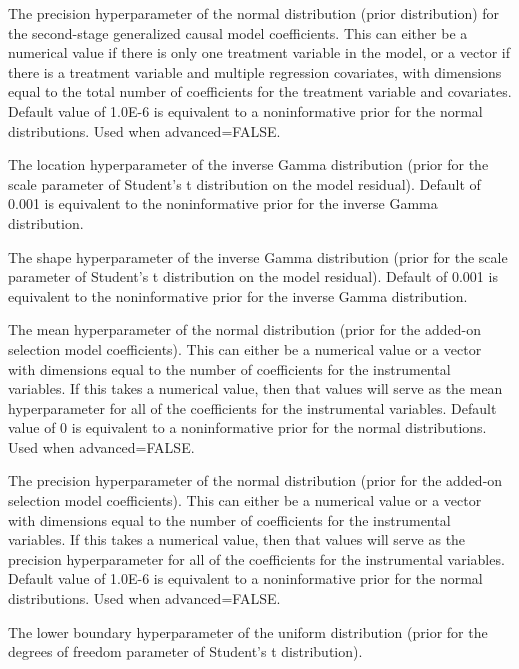 \documentclass[a4paper]{book}
\begin{document}
\begin{Arguments}
\begin{ldescription}
\item[\code{G0}] The precision hyperparameter of the normal distribution (prior distribution)
for the second-stage generalized causal model coefficients.
This can either be a numerical value if there is only one treatment variable in the model,
or a vector if there is a treatment variable and multiple regression covariates,
with dimensions equal to the total number of coefficients for the treatment variable and covariates.
Default value of 1.0E-6 is equivalent to a noninformative prior for the normal distributions.
Used when advanced=FALSE.

\item[\code{e0}] The location hyperparameter of the inverse Gamma distribution (prior for the scale parameter
of Student's t distribution on the model residual).
Default of 0.001 is equivalent to the noninformative prior for the inverse Gamma distribution.

\item[\code{E0}] The shape hyperparameter of the inverse Gamma distribution (prior for the scale parameter
of Student's t distribution on the model residual).
Default of 0.001 is equivalent to the noninformative prior for the inverse Gamma distribution.

\item[\code{l0}] The mean hyperparameter of the normal distribution (prior for the added-on selection model coefficients).
This can either be a numerical value or a vector with dimensions equal to the number of coefficients for the instrumental variables.
If this takes a numerical value, then that values will serve as the mean hyperparameter for all of the coefficients
for the instrumental variables. Default value of 0 is equivalent to a noninformative prior for the normal distributions.
Used when advanced=FALSE.

\item[\code{L0}] The precision hyperparameter of the normal distribution (prior for the added-on selection model coefficients).
This can either be a numerical value or a vector with dimensions equal to the number of coefficients for the instrumental variables.
If this takes a numerical value, then that values will serve as the precision hyperparameter for all of the coefficients
for the instrumental variables.
Default value of 1.0E-6 is equivalent to a noninformative prior for the normal distributions.
Used when advanced=FALSE.

\item[\code{v0}] The lower boundary hyperparameter of the uniform distribution (prior for the degrees of freedom
parameter of Student's t distribution).


\end{ldescription}
\end{Arguments}
\end{document}
